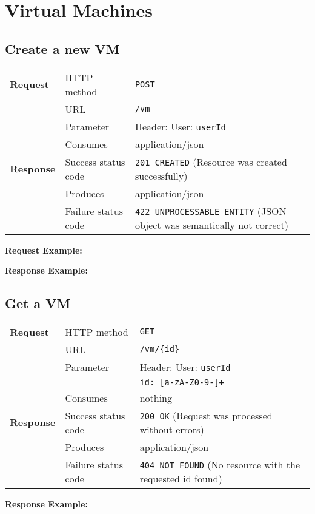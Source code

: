 \section{Virtual Machines} %

\subsection{Create a new VM} %

\begin{center}
	\begin{tabularx}{\textwidth}{llX} 
	    \toprule
					\textbf{Request}        &   HTTP method             &   \texttt{POST}			\tabularnewline
		                        			&   URL                     &   \texttt{/vm}           	\tabularnewline
									& Parameter & Header: User: \texttt{userId} \tabularnewline
                                  &   Consumes                &   application/json					      	\tabularnewline \midrule                       
          \textbf{Response}       &   Success status code     &   \texttt{201 CREATED} (Resource was created successfully) 	\tabularnewline
                                  &   Produces                &   application/json								\tabularnewline
                                  &   Failure status code     &   \texttt{422 UNPROCESSABLE ENTITY} (JSON object was semantically not correct)	\tabularnewline
           \bottomrule
	\end{tabularx}
\end{center}
\pagebreak[3] 	
		\textbf{Request Example:}
		
\pagebreak[3]
		\textbf{Response Example:}
		


\subsection{Get a VM} %

\begin{center}
	\begin{tabularx}{\textwidth}{llX} 
	    \toprule
					\textbf{Request}        &   HTTP method             &   \texttt{GET}			\tabularnewline
		                        			&   URL                     &   \texttt{/vm/\{id\}}           	\tabularnewline
									& Parameter & Header: User: \texttt{userId} \tabularnewline
													& & \texttt{id: [a-zA-Z0-9-]+} \tabularnewline
                                  &   Consumes                &   nothing					      	\tabularnewline \midrule                       
          \textbf{Response}       &   Success status code     &   \texttt{200 OK} (Request was processed without errors) 	\tabularnewline
                                  &   Produces                &   application/json								\tabularnewline
                                  &   Failure status code     &   \texttt{404 NOT FOUND} (No resource with the requested id found)	\tabularnewline
           \bottomrule
	\end{tabularx}
\end{center}
\pagebreak[3] 	
\pagebreak[3]
		\textbf{Response Example:}
		



